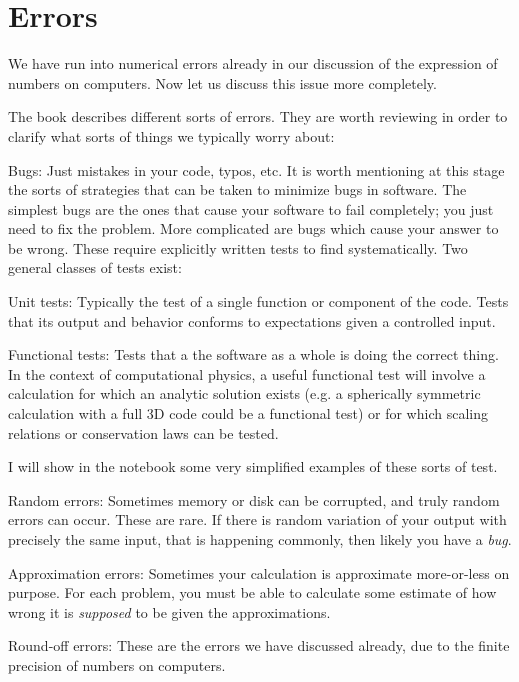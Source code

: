 \section{Errors}

We have run into numerical errors already in our discussion of the
expression of numbers on computers. Now let us discuss this issue more
completely. 

The book describes different sorts of errors. They are worth reviewing
in order to clarify what sorts of things we typically worry about:
\begin{ditemize}
\item Bugs: Just mistakes in your code, typos, etc. It is worth
  mentioning at this stage the sorts of strategies that can be taken
  to minimize bugs in software. The simplest bugs are the ones that
  cause your software to fail completely; you just need to fix the
  problem. More complicated are bugs which cause your answer to be
  wrong. These require explicitly written tests to find
  systematically. Two general classes of tests  exist:
  \begin{ditemize}
    \item Unit tests: Typically the test of a single function or
      component of the code. Tests that its output and behavior
      conforms to expectations given a controlled input.
    \item Functional tests: Tests that a the software as a whole is
      doing the correct thing. In the context of computational
      physics, a useful functional test will involve a calculation for
      which an analytic solution exists (e.g. a spherically symmetric
      calculation with a full 3D code could be a functional test) or
      for which scaling relations or conservation laws can be tested.
  \end{ditemize}
  I will show in the notebook some very simplified examples of these
  sorts of test.
\item Random errors: Sometimes memory or disk can be corrupted, and
  truly random errors can occur. These are rare. If there is random
  variation of your output with precisely the same input, that is
  happening commonly, then likely you have a {\it bug}.
\item Approximation errors: Sometimes your calculation is approximate
  more-or-less on purpose. For each problem, you must be able to
  calculate some estimate of how wrong it is {\it supposed} to be
  given the approximations.
\item Round-off errors: These are the errors we have discussed
  already, due to the finite precision of numbers on computers. 
\end{ditemize}

